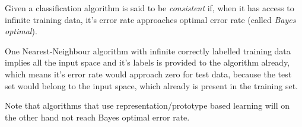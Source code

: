 \documentclass[a4paper,11pt]{article}
\begin{document}
\begin{mlsolution}

Given a classification algorithm is said to be \textit{consistent} if, when it has access to infinite training data, it's error rate approaches optimal error rate (called \textit{Bayes optimal}).

One Nearest-Neighbour algorithm with infinite correctly labelled training data implies all the input space and it's labels is provided to the algorithm already, which means it's error rate would approach zero for test data, because the test set would belong to the input space, which already is present in the training set.

Note that algorithms that use representation/prototype based learning will on the other hand not reach Bayes optimal error rate.

\end{mlsolution}
\end{document}
